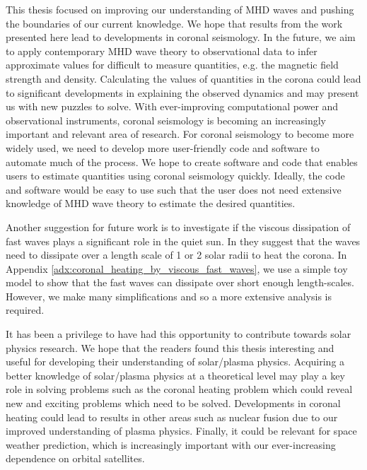 This thesis focused on improving our understanding of MHD waves and pushing the boundaries of our current knowledge. We hope that results from the work presented here lead to developments in coronal seismology. In the future, we aim to apply contemporary MHD wave theory to observational data to infer approximate values for difficult to measure quantities, e.g. the magnetic field strength and density. Calculating the values of quantities in the corona could lead to significant developments in explaining the observed dynamics and may present us with new puzzles to solve. With ever-improving computational power and observational instruments, coronal seismology is becoming an increasingly important and relevant area of research. For coronal seismology to become more widely used, we need to develop more user-friendly code and software to automate much of the process. We hope to create software and code that enables users to estimate quantities using coronal seismology quickly. Ideally, the code and software would be easy to use such that the user does not need extensive knowledge of MHD wave theory to estimate the desired quantities. 

Another suggestion for future work is to investigate if the viscous dissipation of fast waves plays a significant role in the quiet sun. In \citet{Withbroe1977,Parker1991} they suggest that the waves need to dissipate over a length scale of 1 or 2 solar radii to heat the corona. In Appendix \ref{adx:coronal_heating_by_viscous_fast_waves}, we use a simple toy model to show that the fast waves can dissipate over short enough length-scales. However, we make many simplifications and so a more extensive analysis is required. 

It has been a privilege to have had this opportunity to contribute towards solar physics research. We hope that the readers found this thesis interesting and useful for developing their understanding of solar/plasma physics. Acquiring a better knowledge of solar/plasma physics at a theoretical level may play a key role in solving problems such as the coronal heating problem which could reveal new and exciting problems which need to be solved. Developments in coronal heating could lead to results in other areas such as nuclear fusion due to our improved understanding of plasma physics.  Finally, it could be relevant for space weather prediction,  which is increasingly important with our ever-increasing dependence on orbital satellites.